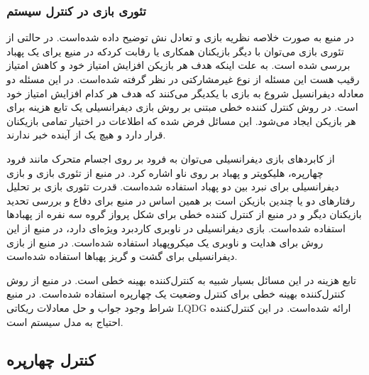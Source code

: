 \subsubsection{تئوری بازی در کنترل سیستم}
در منبع \cite{article1} به صورت خلاصه نظریه بازی و تعادل نش توضیح داده شده‌است. در حالتی از تئوری بازی می‌توان با دیگر بازیکنان همکاری یا رقابت کردکه در منیع\cite{8376282} یرای یک پهباد بررسی شده است. به علت اینکه هدف هر بازیکن افزایش امتیاز خود و کاهش امتیاز رقیب هست این مسئله از نوع غیرمشارکتی در نظر گرفته شده‌است. در این مسئله دو معادله دیفرانسیل شروع به بازی با یکدیگر می‌کنند که هدف هر کدام افزایش امتیاز خود است. در روش کنترل کننده خطی مبتنی بر روش بازی دیفرانسیلی یک تابع هزینه برای هر بازیکن ایجاد می‌شود. این مسائل فرض شده که اطلاعات در اختیار تمامی بازیکنان قرار دارد و هیچ یک از آینده خبر ندارند.

از کابردهای بازی دیفرانسیلی می‌توان به فرود بر روی اجسام متحرک مانند فرود چهارپره، هلیکوپتر و پهباد بر روی ناو\cite{8996044} اشاره کرد. در منبع \cite{9001045} از تئوری بازی و بازی دیفرانسیلی برای نبرد بین دو پهباد استفاده شده‌است. قدرت تئوری بازی بر تحلیل رفتارهای دو یا چندین بازیکن است بر همین اساس در منبع \cite{Pachter2019} برای دفاع و بررسی تحدید بازیکنان دیگر و در منبع \cite{7502594} از کنترل کننده خطی برای شکل پرواز گروه سه نفره از پهبادها استفاده شده‌است. بازی دیفرانسیلی در ناوبری کاردبرد ویژه‌ای دارد، در منبع \cite{6160198} از این روش برای هدایت و ناوبری یک میکروپهباد استفاده شده‌است. در منبع \cite{1595165} از بازی دیفرانسیلی برای گشت و گریز پهباها استفاده شده‌است.

تابع هزینه در این مسائل بسیار شبیه به کنترل‌کننده بهینه خطی است. در منبع \cite{4399042} از روش کنترل‌کننده بهینه خطی برای کنترل وضعیت یک چهارپره استفاده شده‌است. در منبع \cite{article2} شراط وجود جواب و حل معادلات ریکاتی  LQDG ارائه شده‌است. در این کنترل‌کننده احتیاج به مدل سیستم است.
\subsection{کنترل چهارپره}
